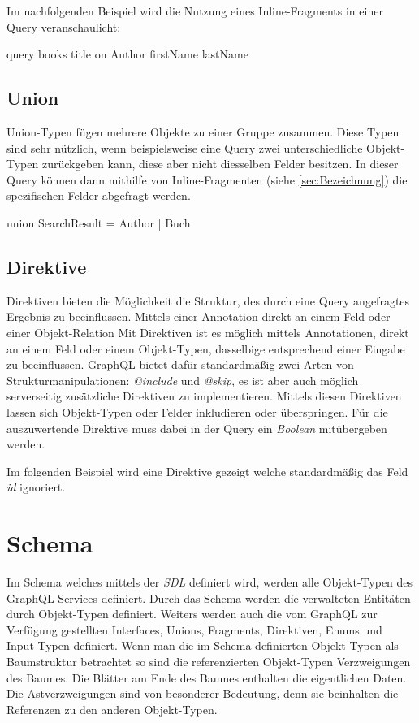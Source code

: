 Im nachfolgenden Beispiel wird die Nutzung eines Inline-Fragments in einer Query veranschaulicht:
\begin{JsCode}
query{
    books{
        title
        on Author{
            firstName
            lastName
        }
    }
}
\end{JsCode}

\subsection{Union}
Union-Typen fügen mehrere Objekte zu einer Gruppe zusammen.
Diese Typen sind sehr nützlich, wenn beispielsweise eine Query zwei unterschiedliche Objekt-Typen zurückgeben kann, diese aber nicht diesselben Felder besitzen.
In dieser Query können dann mithilfe von Inline-Fragmenten (siehe \ref{sec:Bezeichnung}) die spezifischen Felder abgefragt werden.

\begin{JsCode}
union SearchResult = Author | Buch
\end{JsCode}

\subsection{Direktive}
Direktiven bieten die Möglichkeit die Struktur, des durch eine Query angefragtes Ergebnis zu beeinflussen.
Mittels einer Annotation direkt an einem Feld oder einer Objekt-Relation
Mit Direktiven ist es möglich mittels Annotationen, direkt an einem Feld oder einem Objekt-Typen, dasselbige entsprechend einer Eingabe zu beeinflussen.
GraphQL bietet dafür standardmäßig zwei Arten von Strukturmanipulationen: \textit{@include} und \textit{@skip}, es ist aber auch möglich serverseitig zusätzliche Direktiven zu implementieren.
Mittels diesen Direktiven lassen sich Objekt-Typen oder Felder inkludieren oder überspringen.
Für die auszuwertende Direktive muss dabei in der Query ein \textit{Boolean} mitübergeben werden.

Im folgenden Beispiel wird eine Direktive gezeigt welche standardmäßig das Feld \textit{id} ignoriert.



\section{Schema}
Im Schema welches mittels der \textit{SDL} definiert wird, werden alle Objekt-Typen des GraphQL-Services definiert.
Durch das Schema werden die verwalteten Entitäten durch Objekt-Typen definiert.
Weiters werden auch die vom GraphQL zur Verfügung gestellten Interfaces, Unions, Fragments, Direktiven, Enums und Input-Typen definiert.
Wenn man die im Schema definierten Objekt-Typen als Baumstruktur betrachtet so sind die referenzierten Objekt-Typen Verzweigungen des Baumes.
Die Blätter am Ende des Baumes enthalten die eigentlichen Daten.
Die Astverzweigungen sind von besonderer Bedeutung, denn sie beinhalten die Referenzen zu den anderen Objekt-Typen.
\cite[S.60]{kress2020graphql}

